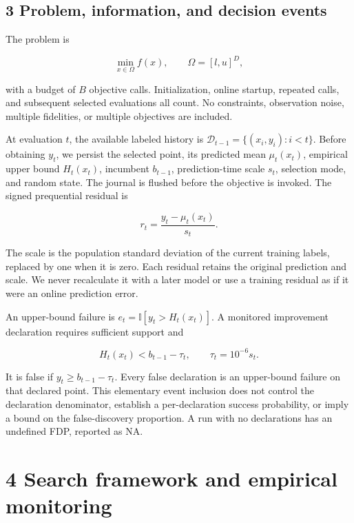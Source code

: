 \documentclass[11pt,a4paper]{article}
\begin{document}
\begin{samepage}

\hypertarget{problem-information-and-decision-events}{%
\section{3 Problem, information, and decision
events}\label{problem-information-and-decision-events}}

The problem is

\[\min_{x\in\Omega}f(x),\qquad\Omega=[l,u]^D,\]

\end{samepage}

with a budget of \(B\) objective calls. Initialization, online startup,
repeated calls, and subsequent selected evaluations all count. No
constraints, observation noise, multiple fidelities, or multiple
objectives are included.

At evaluation \(t\), the available labeled history is
\(\mathcal D_{t-1}=\{(x_i,y_i):i<t\}\). Before obtaining \(y_t\), we
persist the selected point, its predicted mean \(\mu_t(x_t)\), empirical
upper bound \(H_t(x_t)\), incumbent \(b_{t-1}\), prediction-time scale
\(s_t\), selection mode, and random state. The journal is flushed before
the objective is invoked. The signed prequential residual is

\[r_t=\frac{y_t-\mu_t(x_t)}{s_t}.\]

The scale is the population standard deviation of the current training
labels, replaced by one when it is zero. Each residual retains the
original prediction and scale. We never recalculate it with a later
model or use a training residual as if it were an online prediction
error.

An upper-bound failure is \(e_t=\mathbb I[y_t>H_t(x_t)]\). A monitored
improvement declaration requires sufficient support and

\[H_t(x_t)<b_{t-1}-\tau_t,\qquad\tau_t=10^{-6}s_t.\]

It is false if \(y_t\ge b_{t-1}-\tau_t\). Every false declaration is an
upper-bound failure on that declared point. This elementary event
inclusion does not control the declaration denominator, establish a
per-declaration success probability, or imply a bound on the
false-discovery proportion. A run with no declarations has an undefined
FDP, reported as NA.

\hypertarget{search-framework-and-empirical-monitoring}{%
\section{4 Search framework and empirical
monitoring}\label{search-framework-and-empirical-monitoring}}
\end{document}
